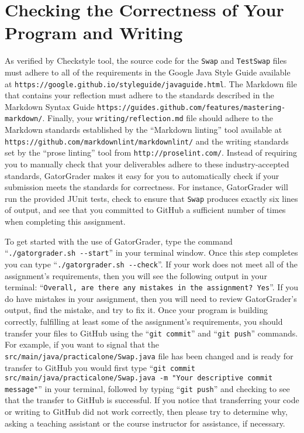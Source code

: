 \documentclass[11pt]{article}
\newcommand{\mainprogram}{\lstinline{Swap}}
\newcommand{\mainprogramsource}{\lstinline{src/main/java/practicalone/Swap.java}}
\newcommand{\testprogram}{\lstinline{TestSwap}}
\newcommand{\reflection}{\lstinline{writing/reflection.md}}
\newcommand{\gatorgraderstart}{\command{./gatorgrader.sh --start}}
\newcommand{\gatorgradercheck}{\command{./gatorgrader.sh --check}}
\newcommand{\gitcommit}{\command{git commit}}
\newcommand{\gitpush}{\command{git push}}
\newcommand{\gitcommitmainprogram}{\command{git commit src/main/java/practicalone/Swap.java -m "Your
descriptive commit message"}}
\newcommand{\command}[1]{``\lstinline{#1}''}
\newcommand{\url}[1]{\lstinline{#1}}
\newcommand{\step}[1]{``{#1}''}
\begin{document}

\section*{Checking the Correctness of Your Program and Writing}

As verified by Checkstyle tool, the source code for the \mainprogram{} and \testprogram{} files must adhere to all of
the requirements in the Google Java Style Guide available at \url{https://google.github.io/styleguide/javaguide.html}.
The Markdown file that contains your reflection must adhere to the standards described in the Markdown Syntax Guide
\url{https://guides.github.com/features/mastering-markdown/}. Finally, your \reflection{} file should adhere to the
Markdown standards established by the \step{Markdown linting} tool available at
\url{https://github.com/markdownlint/markdownlint/} and the writing standards set by the \step{prose linting} tool from
\url{http://proselint.com/}. Instead of requiring you to manually check that your deliverables adhere to these
industry-accepted standards, GatorGrader makes it easy for you to automatically check if your submission meets the
standards for correctness. For instance, GatorGrader will run the provided JUnit tests, check to ensure that
\mainprogram{} produces exactly six lines of output, and see that you committed to GitHub a sufficient number of times
when completing this assignment.

To get started with the use of GatorGrader, type the command \gatorgraderstart{} in your terminal window. Once this step
completes you can type \gatorgradercheck{}. If your work does not meet all of the assignment's requirements, then you
will see the following output in your terminal: \command{Overall, are there any mistakes in the assignment? Yes}. If you
do have mistakes in your assignment, then you will need to review GatorGrader's output, find the mistake, and try to fix
it. Once your program is building correctly, fulfilling at least some of the assignment's requirements, you should
transfer your files to GitHub using the \gitcommit{} and \gitpush{} commands. For example, if you want to signal that
the \mainprogramsource{} file has been changed and is ready for transfer to GitHub you would first type
\gitcommitmainprogram{} in your terminal, followed by typing \gitpush{} and checking to see that the transfer to GitHub
is successful. If you notice that transferring your code or writing to GitHub did not work correctly, then please try to
determine why, asking a teaching assistant or the course instructor for assistance, if necessary.
\end{document}
